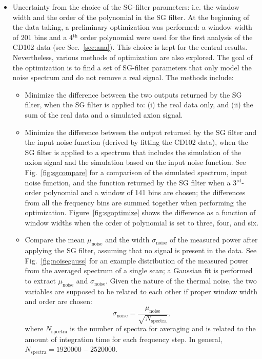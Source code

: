\begin{itemize}
\item Uncertainty from the choice of the SG-filter parameters: i.e.  
the window width and the order of the polynomial in the SG filter. At the 
beginning of the data taking, a preliminary optimization was performed: a 
window width of 201 bins and a 4$^\text{th}$ order polynomial were used for 
the first analysis of the CD102 data (see Sec.~\ref{sec:ana}). 
This choice is kept for the central results. 
Nevertheless, various methods of optimization are also explored. The goal 
of the optimization is to find a set of SG-filter parameters that only 
model the noise spectrum and do not remove a real signal. 
The methods include:
\begin{itemize}
 \item Minimize the difference between the two outputs returned by the SG 
filter, when the SG filter is applied to: (i) the real data only, and (ii) 
the sum of the real data and a simulated axion signal. 
 \item Minimize the difference between the output returned by the 
 SG filter and the input noise function (derived by fitting the CD102 data), 
when the SG filter is applied to
a spectrum that includes the simulation of the axion signal and 
the simulation based on the input noise function. See Fig.~\ref{fig:sgcompare} 
for a comparison of  the simulated spectrum, input noise function, and the 
function returned by 
 the SG filter when a 3$^\text{rd}$-order polynomial and a window of 141 
 bins are chosen; the differences from all the frequency bins are summed 
 together when performing the optimization.
 Figure~\ref{fig:sgoptimize} shows the difference 
as a function of window widths when the order of polynomial is 
 set to three, four, and six. 
 \item Compare the mean $\mu_\text{noise}$ and the width $\sigma_\text{noise}$ 
of the measured power after applying the SG filter, 
assuming that no signal is present in the 
data. See Fig.~\ref{fig:noisegauss} for an example distribution 
of the measured power from the averaged spectrum of a 
single scan; %
a Gaussian fit is performed to extract 
$\mu_\text{noise}$ and $\sigma_\text{noise}$. Given the nature of the 
thermal noise, the two variables are supposed to be related to 
each other if proper window width and order are chosen:
\begin{equation*} 
\sigma_\text{noise} = \frac{\mu_\text{noise}}{\sqrt{N_\text{spectra}}},
\end{equation*}
where $N_\text{spectra}$ is the number of spectra for averaging and 
is related to the amount of integration time for each frequency step. In 
general, $N_\text{spectra}=1920000-2520000$. 
\end{itemize}


\end{itemize}
